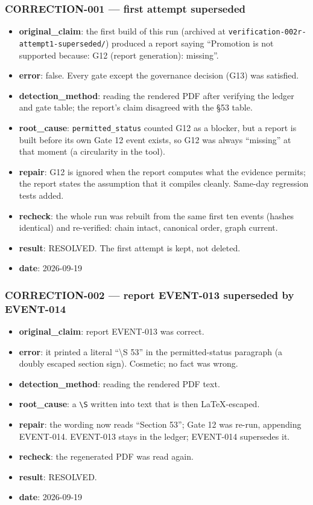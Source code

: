 \documentclass[11pt]{article}
\begin{document}
\subsubsection*{CORRECTION-001 --- first attempt superseded}
\begin{itemize}
\item \textbf{original\_claim}: the first build of this run (archived at \texttt{verification-002r-attempt1-superseded/}) produced a report saying ``Promotion is not supported because: G12 (report generation): missing''.
\item \textbf{error}: false. Every gate except the governance decision (G13) was satisfied.
\item \textbf{detection\_method}: reading the rendered PDF after verifying the ledger and gate table; the report's claim disagreed with the \S{}53 table.
\item \textbf{root\_cause}: \texttt{permitted\_status} counted G12 as a blocker, but a report is built before its own Gate 12 event exists, so G12 was always ``missing'' at that moment (a circularity in the tool).
\item \textbf{repair}: G12 is ignored when the report computes what the evidence permits; the report states the assumption that it compiles cleanly. Same-day regression tests added.
\item \textbf{recheck}: the whole run was rebuilt from the same first ten events (hashes identical) and re-verified: chain intact, canonical order, graph current.
\item \textbf{result}: RESOLVED. The first attempt is kept, not deleted.
\item \textbf{date}: 2026-09-19
\end{itemize}
\subsubsection*{CORRECTION-002 --- report EVENT-013 superseded by EVENT-014}
\begin{itemize}
\item \textbf{original\_claim}: report EVENT-013 was correct.
\item \textbf{error}: it printed a literal ``\textbackslash{}S 53'' in the permitted-status paragraph (a doubly escaped section sign). Cosmetic; no fact was wrong.
\item \textbf{detection\_method}: reading the rendered PDF text.
\item \textbf{root\_cause}: a \texttt{\textbackslash{}S} written into text that is then LaTeX-escaped.
\item \textbf{repair}: the wording now reads ``Section 53''; Gate 12 was re-run, appending EVENT-014. EVENT-013 stays in the ledger; EVENT-014 supersedes it.
\item \textbf{recheck}: the regenerated PDF was read again.
\item \textbf{result}: RESOLVED.
\item \textbf{date}: 2026-09-19
\end{itemize}
\end{document}
